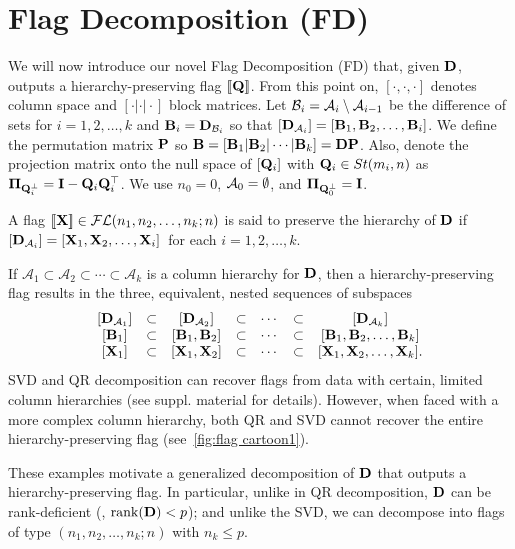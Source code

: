 
\section{Flag Decomposition (FD)}\label{sec:methods}
We will now introduce our novel Flag Decomposition (FD) that, given $\mathbf{D}$, outputs a hierarchy-preserving flag $[\![\mathbf{Q}]\!]$. From this point on, $[\cdot,\cdot,\cdot]$ denotes column space and $[\cdot|\cdot|\cdot]$ block matrices. Let $\mathcal{B}_i = \mathcal{A}_i \setminus \mathcal{A}_{i-1}$ be the difference of sets for $i=1,2,\dots, k$ and $\mathbf{B}_i = \mathbf{D}_{\mathcal{B}_i}$ so that $[\mathbf{D}_{\mathcal{A}_i}] = [\mathbf{B}_1,\mathbf{B}_2,\dots,\mathbf{B}_i]$. We define the permutation matrix $\mathbf{P}$ so $\mathbf{B} = [\mathbf{B}_1|\mathbf{B}_2| \cdots | \mathbf{B}_k] = \mathbf{D}\mathbf{P}$. Also, denote the projection matrix onto the null space of $[\mathbf{Q}_i]$ with $\mathbf{Q}_i \in St(m_i,n)$ as $\boldsymbol{\Pi}_{\mathbf{Q}_i^\perp} = \mathbf{I} - \mathbf{Q}_i\mathbf{Q}_i^\top$. We use $n_0 = 0$, $\mathcal{A}_0 = \emptyset$, and $\boldsymbol{\Pi}_{\mathbf{Q}_0^\perp} = \mathbf{I}$. 



\begin{dfn}
     A flag $[\![\mathbf{X}]\!] \in \mathcal{FL}(n_1,n_2,\dots, n_k;n)$ is said to preserve the hierarchy of $\mathbf{D}$ if $[\mathbf{D}_{\mathcal{A}_i}] = [\mathbf{X}_1,\mathbf{X}_2,\dots,\mathbf{X}_i]\,$ for each $i=1,2,\dots,k$. 
\end{dfn}

If $\mathcal{A}_1 \subset \mathcal{A}_2 \subset \cdots \subset \mathcal{A}_k$ is a column hierarchy for $\mathbf{D}$, then a hierarchy-preserving flag results in the three, equivalent, nested sequences of subspaces
\begin{equation*}
    \begin{matrix}
        [\D_{\cA_1}] & \subset & [\D_{\cA_2}] & \subset & \cdots & \subset & [\D_{\cA_k}]\\    
        [\B_1] & \subset & [\B_1,\B_2] & \subset & \cdots & \subset & [\B_1,\B_2, \dots,\B_k]\\
        [\X_1] & \subset & [\X_1,\X_2] & \subset & \cdots & \subset & [\X_1,\X_2,\dots,\X_k].
    \end{matrix}
\end{equation*}
SVD and QR decomposition can recover flags from data with certain, limited column hierarchies (see suppl. material for details). However, when faced with a more complex column hierarchy, both QR and SVD cannot recover the entire hierarchy-preserving flag (see~\cref{fig:flag cartoon1}).



These examples motivate a generalized decomposition of $\mathbf{D}$ that outputs a hierarchy-preserving flag. In particular, unlike in QR decomposition, $\mathbf{D}$ can be rank-deficient (\eg, $\mathrm{rank}(\mathbf{D}) < p$); and unlike the SVD, we can decompose into flags of type $(n_1,n_2,\dots,n_k;n)$ with $n_k \leq p$. 

